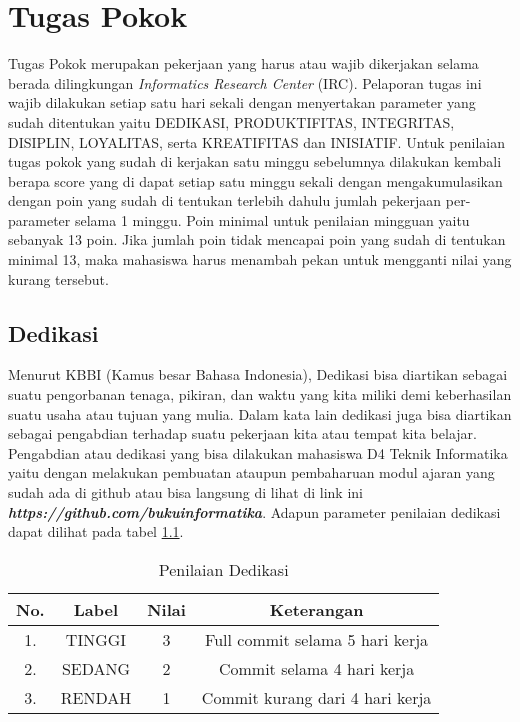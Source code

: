 \chapter{Tugas Pokok}

Tugas Pokok merupakan pekerjaan yang harus atau wajib dikerjakan selama berada dilingkungan \textit{Informatics Research Center} (IRC). Pelaporan tugas ini wajib dilakukan setiap satu hari sekali dengan menyertakan parameter yang sudah ditentukan yaitu DEDIKASI, PRODUKTIFITAS, INTEGRITAS, DISIPLIN, LOYALITAS, serta KREATIFITAS dan INISIATIF. Untuk penilaian tugas pokok yang sudah di kerjakan satu minggu sebelumnya dilakukan kembali berapa score yang di dapat setiap satu minggu sekali dengan mengakumulasikan dengan poin yang sudah di tentukan terlebih dahulu jumlah pekerjaan per-parameter selama 1 minggu. Poin minimal untuk penilaian mingguan yaitu sebanyak 13 poin. Jika jumlah poin tidak mencapai poin yang sudah di tentukan minimal 13, maka mahasiswa harus menambah pekan untuk mengganti nilai yang kurang tersebut.

\section{Dedikasi}

Menurut KBBI (Kamus besar Bahasa Indonesia), Dedikasi bisa diartikan sebagai suatu pengorbanan tenaga, pikiran, dan waktu yang kita miliki demi keberhasilan suatu usaha atau tujuan yang mulia. Dalam kata lain dedikasi juga bisa diartikan sebagai pengabdian terhadap suatu pekerjaan kita atau tempat kita belajar. Pengabdian atau dedikasi yang bisa dilakukan mahasiswa D4 Teknik Informatika yaitu dengan melakukan pembuatan ataupun pembaharuan modul ajaran yang sudah ada di github atau bisa langsung di lihat di link ini \textbf{\textit{https://github.com/bukuinformatika}}. Adapun parameter penilaian dedikasi dapat dilihat pada tabel \ref{table:nilaidedikasi}.

\begin{table}[H]
\caption{Penilaian Dedikasi}
\centering
\begin{tabular}{|c|c|c|c|}
\hline
\textbf{No.}&\textbf{Label}&\textbf{Nilai}&\textbf{Keterangan}\\
\hline
1.&TINGGI&3&Full commit selama 5 hari kerja\\
\hline
2.&SEDANG&2&Commit selama 4 hari kerja\\
\hline
3.&RENDAH&1&Commit kurang dari 4 hari kerja\\
\hline
\end{tabular}
\label{table:nilaidedikasi}
\end{table}

